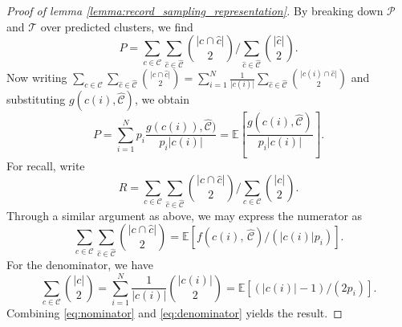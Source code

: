 \documentclass[fontsize=11pt]{article}
\theoremstyle{definition}
\begin{document}
\begin{proof}[Proof of lemma \ref{lemma:record_sampling_representation}]
By breaking down $\mathcal{P}$ and $\mathcal{T}$ over predicted clusters, we find
\begin{equation}
    P = \sum_{c\in\mathcal{C}} \sum_{\hat c \in \widehat{\mathcal{C}}} {\lvert c \cap \hat c \rvert \choose 2} \Big/ \sum_{\hat c \in \widehat{\mathcal{C}}} {\lvert \hat c \rvert \choose 2}.
\end{equation}
Now writing $\sum_{c \in \mathcal{C}} \sum_{\hat c \in \widehat{\mathcal{C}}}{\lvert c \cap \hat c \rvert \choose 2} = \sum_{i=1}^{N} \frac{1}{\lvert c(i) \rvert} \sum_{\hat c \in \widehat{\mathcal{C}}} {\lvert c(i) \cap \hat c \rvert \choose 2}$ and substituting $g(c(i), \widehat{\mathcal{C}})$, we obtain
\begin{equation}
    P = \sum_{i=1}^N p_i \frac{g(c(i)), \widehat{\mathcal{C}})}{p_i \lvert c(i) \rvert} = \mathbb{E}\left[ \frac{g(c(i), \widehat{\mathcal{C}})}{p_i \lvert c(i) \rvert} \right].
\end{equation}
For recall, write 
\begin{equation}\label{eq:recall_cluster_form}
    R = \sum_{c\in\mathcal{C}} \sum_{\hat c \in \widehat{\mathcal{C}}} {\lvert c \cap \hat c \rvert \choose 2} \Big/ \sum_{ c \in {\mathcal{C}}} {\lvert c \rvert \choose 2}.
\end{equation}
Through a similar argument as above, we may express the numerator as 
\begin{equation}\label{eq:nominator}
    \sum_{c\in\mathcal{C}} \sum_{\hat c \in \widehat{\mathcal{C}}} {\lvert c \cap \hat c \rvert \choose 2} = \mathbb{E}\left[ f(c(i),\, \widehat{\mathcal{C}})  \big/ (\lvert c(i) \rvert p_i) \right].
\end{equation}
For the denominator, we have
\begin{equation}\label{eq:denominator}
    \sum_{c \in \mathcal{C}} {\lvert c \rvert \choose 2} = \sum_{i=1}^N \frac{1}{\lvert c(i) \rvert}  {\lvert c(i) \rvert \choose 2} = \mathbb{E}[ (\lvert c(i) \rvert - 1)/(2 p_i)].
\end{equation}
Combining \eqref{eq:nominator} and \eqref{eq:denominator} yields the result. 
\end{proof}
\end{document}
